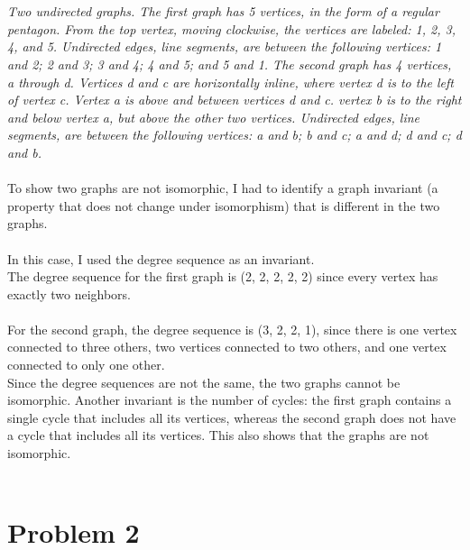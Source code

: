 \documentclass{amsart}
\theoremstyle{definition}
\theoremstyle{Exercise}
\theoremstyle{remark}
\theoremstyle{rule}
\numberwithin{equation}{section}
\begin{document}
\begin{enumerate}[label=(\alph*)]
\\\\
{\color{blue}{\bf Figure 5:} \emph{Two undirected graphs. The first graph has 5 vertices, in the form of a regular pentagon. From the top vertex, moving clockwise, the vertices are labeled: 1, 2, 3, 4, and 5. Undirected edges, line segments, are between the following vertices: 1 and 2; 2 and 3; 3 and 4; 4 and 5; and 5 and 1. The second graph has 4 vertices, a through d. Vertices d and c are horizontally inline, where vertex d is to the left of vertex c. Vertex a is above and between vertices d and c. vertex b is to the right and below vertex a, but above the other two vertices. Undirected edges, line segments, are between the following vertices: a and b; b and c; a and d; d and c; d and b.
}
}
\\
\\
To show two graphs are not isomorphic, I had to identify a graph invariant (a property that does not change under isomorphism) that is different in the two graphs.\\\\

In this case, I used the degree sequence as an invariant.\\
The degree sequence for the first graph is (2, 2, 2, 2, 2) since every vertex has exactly two neighbors.\\\\
For the second graph, the degree sequence is (3, 2, 2, 1), since there is one vertex connected to three others, two vertices connected to two others, and one vertex connected to only one other.\\

Since the degree sequences are not the same, the two graphs cannot be isomorphic. Another invariant is the number of cycles: the first graph contains a single cycle that includes all its vertices, whereas the second graph does not have a cycle that includes all its vertices. This also shows that the graphs are not isomorphic.
\\\\

\end{enumerate}    
    
 \newpage

 

\section*{Problem 2}    
    
\end{document}
